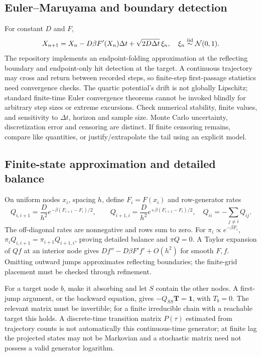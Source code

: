 \documentclass[11pt,a4paper]{article}
\theoremstyle{remark}\newtheorem*{remark}{Physical interpretation}
\begin{document}
\subsection{Euler--Maruyama and boundary detection}
For constant $D$ and $F$,
\begin{equation}X_{n+1}=X_n-D\beta F'(X_n)\Delta t+\sqrt{2D\Delta t}\,\xi_n,\quad \xi_n\stackrel{\rm iid}{\sim}\mathcal N(0,1).\end{equation}
The repository implements an endpoint-folding approximation at the reflecting boundary and endpoint-only hit detection at the target. A continuous trajectory may cross and return between recorded steps, so finite-step first-passage statistics need convergence checks. The quartic potential's drift is not globally Lipschitz; standard finite-time Euler convergence theorems cannot be invoked blindly for arbitrary step sizes or extreme excursions. Check numerical stability, finite values, and sensitivity to $\Delta t$, horizon and sample size. Monte Carlo uncertainty, discretization error and censoring are distinct. If finite censoring remains, compare like quantities, or justify/extrapolate the tail using an explicit model.

\subsection{Finite-state approximation and detailed balance}
On uniform nodes $x_i$, spacing $h$, define $F_i=F(x_i)$ and row-generator rates
\begin{equation}Q_{i,i+1}=\frac{D}{h^2}e^{-\beta(F_{i+1}-F_i)/2},\qquad
Q_{i+1,i}=\frac{D}{h^2}e^{+\beta(F_{i+1}-F_i)/2},\quad Q_{ii}=-\sum_{j\ne i}Q_{ij}.
\end{equation}
The off-diagonal rates are nonnegative and rows sum to zero. For $\pi_i\propto e^{-\beta F_i}$, $\pi_iQ_{i,i+1}=\pi_{i+1}Q_{i+1,i}$, proving detailed balance and $\pi Q=0$. A Taylor expansion of $Qf$ at an interior node gives $D f''-D\beta F'f'+O(h^2)$ for smooth $F,f$. Omitting outward jumps approximates reflecting boundaries; the finite-grid placement must be checked through refinement.

For a target node $b$, make it absorbing and let $S$ contain the other nodes. A first-jump argument, or the backward equation, gives $-Q_{SS}\mathbf T=\mathbf1$, with $T_b=0$. The relevant matrix must be invertible; for a finite irreducible chain with a reachable target this holds. A discrete-time transition matrix $P(\tau)$ estimated from trajectory counts is not automatically this continuous-time generator; at finite lag the projected states may not be Markovian and a stochastic matrix need not possess a valid generator logarithm.
\end{document}
